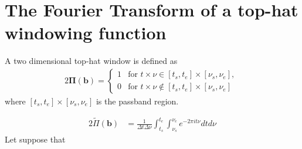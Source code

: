 
\section{The Fourier Transform of a top-hat windowing function} %
\label{AppendixA} %
A two dimensional top-hat window is defined as
\begin{alignat}{2}
\mathbf{\Pi}(\mathbf{b}) = \left\{
\begin{array}{rl}
1 & \mbox{for $\mathit{ t \times \nu \in  [t_s, t_e]\times [\nu_s, \nu_e]}$}, \\
0 & \mbox{for $\mathit{ t \times \nu  \notin [t_s, t_e]\times [\nu_s, \nu_e]}$ }
\end{array}\right.
\end{alignat}
where $[t_s, t_e]\times [\nu_s, \nu_e]$ is the passband region.
 
\begin{alignat*}{2}
\widetilde{\Pi}(\mathbf{b})&= \frac{1}{\Delta t \Delta \nu}\int_{t_s}^{t_e}\int_{\nu_s}^{\nu_e} e^{-2\pi i t\nu}dtd\nu
\end{alignat*}
Let suppose that 


